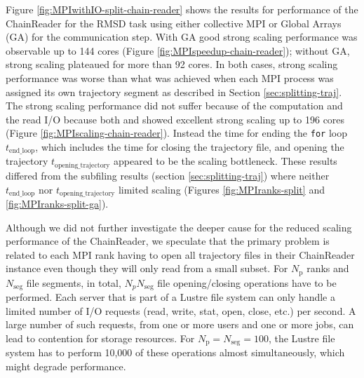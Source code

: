 Figure \ref{fig:MPIwithIO-split-chain-reader} shows the results for performance of the ChainReader for the RMSD task using either collective MPI or Global Arrays (GA) for the communication step.
With GA good strong scaling performance was observable up to 144 cores (Figure \ref{fig:MPIspeedup-chain-reader}); without GA, strong scaling plateaued for more than 92 cores.
In both cases, strong scaling performance was worse than what was achieved when each MPI process was assigned its own trajectory segment as described in Section \ref{sec:splitting-traj}. 
The strong scaling performance did not suffer because of the computation and the read I/O because both \tcomp and \tIO showed excellent strong scaling up to 196 cores (Figure \ref{fig:MPIscaling-chain-reader}).
Instead the time for ending the \texttt{for} loop $t_{\text{end\_loop}}$, which includes the time for closing the trajectory file, and opening the trajectory $t_{\text{opening\_trajectory}}$ appeared to be the scaling bottleneck.
These results differed from the subfiling results (section \ref{sec:splitting-traj}) where neither $t_{\text{end\_loop}}$ nor $t_{\text{opening\_trajectory}}$ limited scaling (Figures \ref{fig:MPIranks-split} and \ref{fig:MPIranks-split-ga}). 

Although we did not further investigate the deeper cause for the reduced scaling performance of the ChainReader, we speculate that the primary problem is related to each MPI rank having to open all trajectory files in their ChainReader instance even though they will only read from a small subset.
For $N_{\text{p}}$ ranks and $N_{\text{seg}}$ file segments, in total, $N_{p } N_{\text{seg}}$ file opening/closing operations have to be performed. 
Each server that is part of a Lustre file system can only handle a limited number of I/O requests (read, write, stat, open, close, etc.) per second.
A large number of such requests, from one or more users and one or more jobs, can lead to contention for storage resources. 
For $N_{\text{p}} = N_{\text{seg}} = 100$, the Lustre file system has to perform 10,000 of these operations almost simultaneously, which might degrade performance. 


